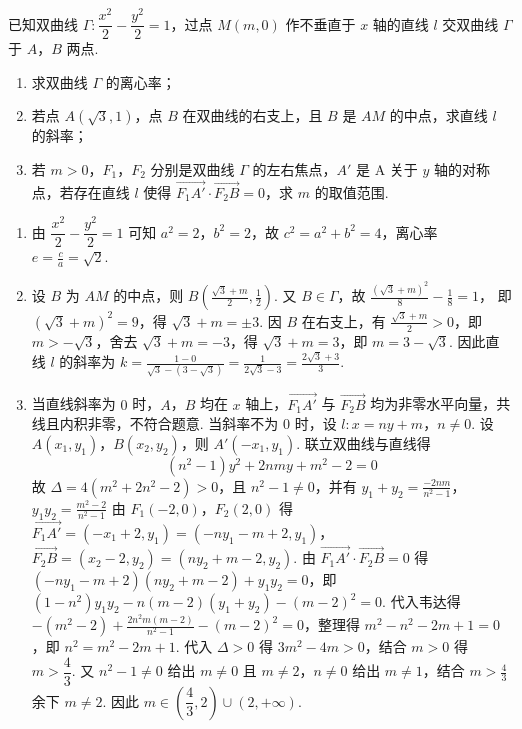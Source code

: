 \documentclass[UTF8,a4paper,oneside,11pt]{ctexbook}
\begin{document}
\begin{problem}
已知双曲线 \(\Gamma:\dfrac{x^2}{2}-\dfrac{y^2}{2}=1\)，过点 \(M(m,0)\) 作不垂直于 \(x\) 轴的直线 \(l\) 交双曲线 \(\Gamma\) 于 \(A\)，\(B\) 两点.

\begin{enumerate}
\item 求双曲线 \(\Gamma\) 的离心率；
\item 若点 \(A(\sqrt3,1)\)，点 \(B\) 在双曲线的右支上，且 \(B\) 是 \(AM\) 的中点，求直线 \(l\) 的斜率；
\item 若 \(m>0\)，\(F_1\)，\(F_2\) 分别是双曲线 \(\Gamma\) 的左右焦点，\(A'\) 是 A 关于 \(y\) 轴的对称点，若存在直线 \(l\) 使得 \(\overrightarrow{F_1A'}\cdot\overrightarrow{F_2B}=0\)，求 \(m\) 的取值范围.
\end{enumerate}
\end{problem}

\begin{solution}
\begin{enumerate}
\item 由 \(\dfrac{x^2}{2}-\dfrac{y^2}{2}=1\) 可知 \(a^2=2\)，\(b^2=2\)，故 \(c^2=a^2+b^2=4\)，离心率 \(e=\frac ca=\sqrt2\).

\item 设 \(B\) 为 \(AM\) 的中点，则
\(B\left(\frac{\sqrt3+m}{2},\frac12\right)\).
又 \(B\in\Gamma\)，故
\(\frac{(\sqrt3+m)^2}{8}-\frac{1}{8}=1\)，
即 \((\sqrt3+m)^2=9\)，得 \(\sqrt3+m=\pm3\). 因 \(B\) 在右支上，有 \(\frac{\sqrt3+m}{2}>0\)，即 \(m>-\sqrt3\)，舍去 \(\sqrt3+m=-3\)，得 \(\sqrt3+m=3\)，即 \(m=3-\sqrt3\).
因此直线 \(l\) 的斜率为
\(k=\frac{1-0}{\sqrt3-(3-\sqrt3)}=\frac1{2\sqrt3-3}=\frac{2\sqrt3+3}{3}\).

\item 当直线斜率为 \(0\) 时，\(A\)，\(B\) 均在 \(x\) 轴上，\(\overrightarrow{F_1A'}\) 与 \(\overrightarrow{F_2B}\) 均为非零水平向量，共线且内积非零，不符合题意. 当斜率不为 \(0\) 时，设 \(l:x=ny+m\)，\(n\ne0\). 设 \(A(x_1,y_1)\)，\(B(x_2,y_2)\)，则 \(A'(-x_1,y_1)\).
联立双曲线与直线得
\[
(n^2-1)y^2+2nmy+m^2-2=0
\]
故 \(\Delta=4(m^2+2n^2-2)>0\)，且 \(n^2-1\ne0\)，并有
\(y_1+y_2=\frac{-2nm}{n^2-1}\)，\(y_1y_2=\frac{m^2-2}{n^2-1}\)
由 \(F_1(-2,0)\)，\(F_2(2,0)\) 得 \(\overrightarrow{F_1A'}=(-x_1+2,y_1)=(-ny_1-m+2,y_1)\)，\(\overrightarrow{F_2B}=(x_2-2,y_2)=(ny_2+m-2,y_2)\). 由 \(\overrightarrow{F_1A'}\cdot\overrightarrow{F_2B}=0\) 得 \((-ny_1-m+2)(ny_2+m-2)+y_1y_2=0\)，即 \((1-n^2)y_1y_2-n(m-2)(y_1+y_2)-(m-2)^2=0\). 代入韦达得 \(-(m^2-2)+\frac{2n^2m(m-2)}{n^2-1}-(m-2)^2=0\)，整理得 \(m^2-n^2-2m+1=0\)，即 \(n^2=m^2-2m+1\). 代入 \(\Delta>0\) 得 \(3m^2-4m>0\)，结合 \(m>0\) 得 \(m>\dfrac43\). 又 \(n^2-1\ne0\) 给出 \(m\ne0\) 且 \(m\ne2\)，\(n\ne0\) 给出 \(m\ne1\)，结合 \(m>\frac43\) 余下 \(m\ne2\). 因此 \(m\in\left(\dfrac43,2\right)\cup(2,+\infty)\).
\end{enumerate}
\end{solution}
\end{document}
